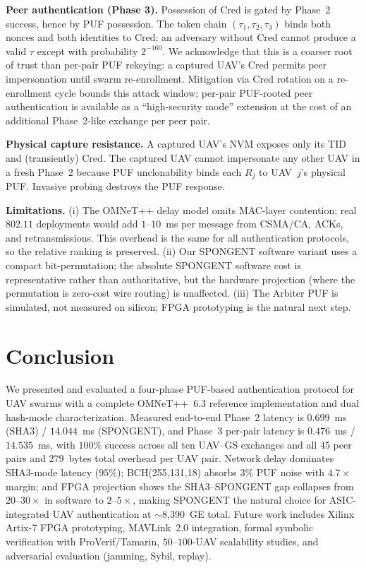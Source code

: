 \documentclass[conference,a4paper,10pt]{IEEEtran}
\begin{document}
\textbf{Peer authentication (Phase 3).} Possession of $\mathrm{Cred}$
is gated by Phase~2 success, hence by PUF possession. The token chain
$(\tau_1,\tau_2,\tau_3)$ binds both nonces and both identities to
$\mathrm{Cred}$; an adversary without $\mathrm{Cred}$ cannot produce
a valid $\tau$ except with probability $2^{-160}$. We acknowledge
that this is a coarser root of trust than per-pair PUF rekeying: a
captured UAV's $\mathrm{Cred}$ permits peer impersonation until
swarm re-enrollment. Mitigation via $\mathrm{Cred}$ rotation on a
re-enrollment cycle bounds this attack window; per-pair PUF-rooted
peer authentication is available as a ``high-security mode''
extension at the cost of an additional Phase~2-like exchange per
peer pair.

\textbf{Physical capture resistance.} A captured UAV's NVM exposes
only its TID and (transiently) $\mathrm{Cred}$. The captured UAV
cannot impersonate any other UAV in a fresh Phase~2 because PUF
unclonability binds each $R_j$ to UAV~$j$'s physical PUF. Invasive
probing destroys the PUF response.

\textbf{Limitations.} (i) The OMNeT++ delay model omits MAC-layer
contention; real $802.11$ deployments would add $1$--$10$~ms per
message from CSMA/CA, ACKs, and retransmissions. This overhead is
the same for all authentication protocols, so the relative ranking
is preserved. (ii) Our SPONGENT software variant uses a compact
bit-permutation; the absolute SPONGENT software cost is
representative rather than authoritative, but the hardware
projection (where the permutation is zero-cost wire routing) is
unaffected. (iii) The Arbiter PUF is simulated, not measured on
silicon; FPGA prototyping is the natural next step.


\section{Conclusion}
\label{sec:conclusion}

We presented and evaluated a four-phase PUF-based authentication
protocol for UAV swarms with a complete OMNeT++~6.3 reference
implementation and dual hash-mode characterization. Measured
end-to-end Phase~2 latency is $0.699$~ms (SHA3) / $14.044$~ms
(SPONGENT), and Phase~3 per-pair latency is $0.476$~ms /
$14.535$~ms, with $100\%$ success across all ten UAV--GS exchanges
and all $45$ peer pairs and $279$~bytes total overhead per UAV pair.
Network delay dominates SHA3-mode latency ($95\%$);
BCH(255,131,18) absorbs $3\%$ PUF noise with $4.7\times$ margin;
and FPGA projection shows the SHA3--SPONGENT gap collapses from
$20$--$30\times$ in software to $2$--$5\times$, making SPONGENT the
natural choice for ASIC-integrated UAV authentication at
$\sim$8{,}390~GE total. Future work includes Xilinx Artix-7 FPGA
prototyping, MAVLink~2.0 integration, formal symbolic verification
with ProVerif/Tamarin, $50$--$100$-UAV scalability studies, and
adversarial evaluation (jamming, Sybil, replay).
\end{document}
